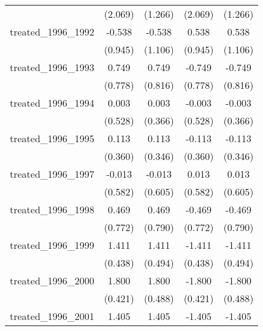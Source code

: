 {\begin{tabular}{l*{4}{c}}
            &     (2.069)         &     (1.266)         &     (2.069)         &     (1.266)         \\
[1em]
treated\_1996\_1992&      -0.538         &      -0.538         &       0.538         &       0.538         \\
            &     (0.945)         &     (1.106)         &     (0.945)         &     (1.106)         \\
[1em]
treated\_1996\_1993&       0.749         &       0.749         &      -0.749         &      -0.749         \\
            &     (0.778)         &     (0.816)         &     (0.778)         &     (0.816)         \\
[1em]
treated\_1996\_1994&       0.003         &       0.003         &      -0.003         &      -0.003         \\
            &     (0.528)         &     (0.366)         &     (0.528)         &     (0.366)         \\
[1em]
treated\_1996\_1995&       0.113         &       0.113         &      -0.113         &      -0.113         \\
            &     (0.360)         &     (0.346)         &     (0.360)         &     (0.346)         \\
[1em]
treated\_1996\_1997&      -0.013         &      -0.013         &       0.013         &       0.013         \\
            &     (0.582)         &     (0.605)         &     (0.582)         &     (0.605)         \\
[1em]
treated\_1996\_1998&       0.469         &       0.469         &      -0.469         &      -0.469         \\
            &     (0.772)         &     (0.790)         &     (0.772)         &     (0.790)         \\
[1em]
treated\_1996\_1999&       1.411\sym{**} &       1.411\sym{**} &      -1.411\sym{**} &      -1.411\sym{**} \\
            &     (0.438)         &     (0.494)         &     (0.438)         &     (0.494)         \\
[1em]
treated\_1996\_2000&       1.800\sym{***}&       1.800\sym{***}&      -1.800\sym{***}&      -1.800\sym{***}\\
            &     (0.421)         &     (0.488)         &     (0.421)         &     (0.488)         \\
[1em]
treated\_1996\_2001&       1.405\sym{**} &       1.405\sym{***}&      -1.405\sym{**} &      -1.405\sym{***}\\

\end{tabular}}
